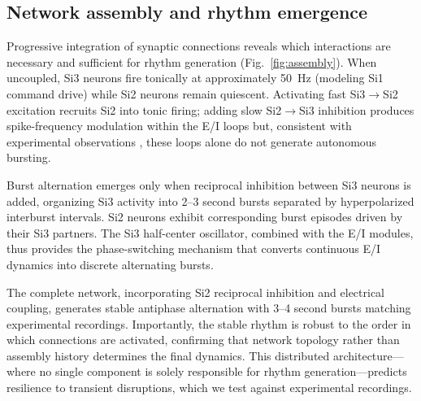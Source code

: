 \subsection{Network assembly and rhythm emergence}

Progressive integration of synaptic connections reveals which interactions are necessary and sufficient for rhythm generation (Fig.~\ref{fig:assembly}).
When uncoupled, Si3 neurons fire tonically at approximately 50~Hz (modeling Si1 command drive) while Si2 neurons remain quiescent.
Activating fast Si3$\to$Si2 excitation recruits Si2 into tonic firing; adding slow Si2$\to$Si3 inhibition produces spike-frequency modulation within the E/I loops but, consistent with experimental observations \cite{SakuraiKatz2016}, these loops alone do not generate autonomous bursting.

Burst alternation emerges only when reciprocal inhibition between Si3 neurons is added, organizing Si3 activity into 2--3 second bursts separated by hyperpolarized interburst intervals.
Si2 neurons exhibit corresponding burst episodes driven by their Si3 partners.
The Si3 half-center oscillator, combined with the E/I modules, thus provides the phase-switching mechanism that converts continuous E/I dynamics into discrete alternating bursts.

The complete network, incorporating Si2 reciprocal inhibition and electrical coupling, generates stable antiphase alternation with 3--4 second bursts matching experimental recordings.
Importantly, the stable rhythm is robust to the order in which connections are activated, confirming that network topology rather than assembly history determines the final dynamics.
This distributed architecture---where no single component is solely responsible for rhythm generation---predicts resilience to transient disruptions, which we test against experimental recordings.
